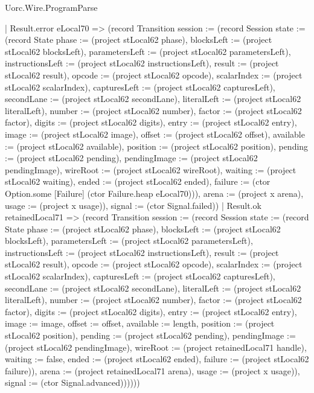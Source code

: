 \begin{lexlean}{Uorc.Wire.ProgramParse}
\begin{semanticmodule}
{              | Result.error eLocal70 => (record Transition {session := (record Session {state := (record State {phase := (project stLocal62 phase), blocksLeft := (project stLocal62 blocksLeft), parametersLeft := (project stLocal62 parametersLeft), instructionsLeft := (project stLocal62 instructionsLeft), result := (project stLocal62 result), opcode := (project stLocal62 opcode), scalarIndex := (project stLocal62 scalarIndex), capturesLeft := (project stLocal62 capturesLeft), secondLane := (project stLocal62 secondLane), literalLeft := (project stLocal62 literalLeft), number := (project stLocal62 number), factor := (project stLocal62 factor), digits := (project stLocal62 digits), entry := (project stLocal62 entry), image := (project stLocal62 image), offset := (project stLocal62 offset), available := (project stLocal62 available), position := (project stLocal62 position), pending := (project stLocal62 pending), pendingImage := (project stLocal62 pendingImage), wireRoot := (project stLocal62 wireRoot), waiting := (project stLocal62 waiting), ended := (project stLocal62 ended), failure := (ctor Option.some [Failure] (ctor Failure.heap eLocal70))}), arena := (project x arena), usage := (project x usage)}), signal := (ctor Signal.failed)})
              | Result.ok retainedLocal71 => (record Transition {session := (record Session {state := (record State {phase := (project stLocal62 phase), blocksLeft := (project stLocal62 blocksLeft), parametersLeft := (project stLocal62 parametersLeft), instructionsLeft := (project stLocal62 instructionsLeft), result := (project stLocal62 result), opcode := (project stLocal62 opcode), scalarIndex := (project stLocal62 scalarIndex), capturesLeft := (project stLocal62 capturesLeft), secondLane := (project stLocal62 secondLane), literalLeft := (project stLocal62 literalLeft), number := (project stLocal62 number), factor := (project stLocal62 factor), digits := (project stLocal62 digits), entry := (project stLocal62 entry), image := image, offset := offset, available := length, position := (project stLocal62 position), pending := (project stLocal62 pending), pendingImage := (project stLocal62 pendingImage), wireRoot := (project retainedLocal71 handle), waiting := false, ended := (project stLocal62 ended), failure := (project stLocal62 failure)}), arena := (project retainedLocal71 arena), usage := (project x usage)}), signal := (ctor Signal.advanced)})))))
}
\end{semanticmodule}
\end{lexlean}
